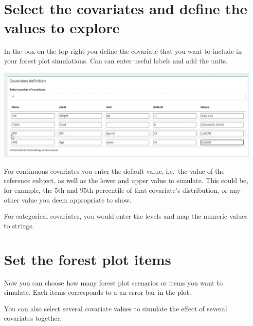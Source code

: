 \documentclass[
]{book}
\begin{document}
\section{Select the covariates and define the values to explore}\label{select-the-covariates-and-define-the-values-to-explore}

In the box on the top-right you define the covariate that you want to include in your forest plot simulations. Can can enter useful labels and add the units.

\includegraphics{pictures/forest_plot_covar_definition.png}

For continuous covariates you enter the default value, i.e.~the value of the reference subject, as well as the lower and upper value to simulate. This could be, for example, the 5th and 95th percentile of that covariate's distribution, or any other value you deem appropriate to show.

For categorical covariates, you would enter the levels and map the numeric values to strings.

\section{Set the forest plot items}\label{set-the-forest-plot-items}

Now you can choose how many forest plot scenarios or items you want to simulate. Each items corresponds to a an error bar in the plot.

You can also select several covariate values to simulate the effect of several covariates together.
\end{document}
